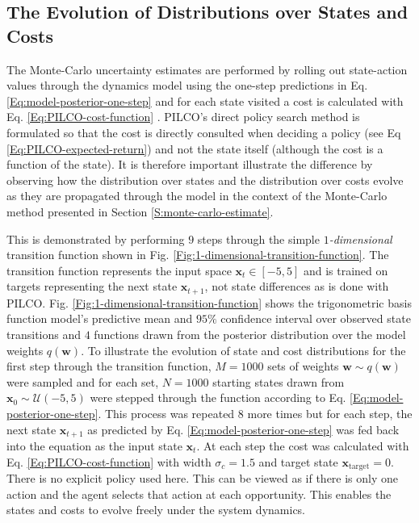 \subsection{The Evolution of Distributions over States and Costs}
The Monte-Carlo uncertainty estimates are performed by rolling out state-action values through the dynamics model using the one-step predictions in Eq. \ref{Eq:model-posterior-one-step} and for each state visited a cost is calculated with Eq. \ref{Eq:PILCO-cost-function} . PILCO's direct policy search method is formulated so that the cost is directly consulted when deciding a policy (see Eq \ref{Eq:PILCO-expected-return}) and not the state itself (although the cost is a function of the state). It is therefore important illustrate the difference by observing how the distribution over states and the distribution over costs evolve as they are propagated through the model in the context of the Monte-Carlo method presented in Section \ref{S:monte-carlo-estimate}.

This is demonstrated by performing $9$ steps through the simple $1$\textit{-dimensional} transition function shown in Fig. \ref{Fig:1-dimensional-transition-function}. The transition function represents the input space $\mathbf{x}_{t}\in [-5, 5]$ and is trained on targets representing the next state $\mathbf{x}_{t+1}$, not state differences as is done with PILCO. Fig. \ref{Fig:1-dimensional-transition-function} shows the trigonometric basis function model's predictive mean and $95\%$ confidence interval over observed state transitions and $4$ functions drawn from the posterior distribution over the model weights $q(\mathbf{w})$. To illustrate the evolution of state and cost distributions for the first step through the transition function, $M=1000$ sets of weights $\mathbf{w} \sim q(\mathbf{w})$ were sampled and for each set, $N=1000$ starting states drawn from $\mathbf{x}_{0} \sim \mathcal{U}(-5,5)$ were stepped through the function according to Eq. \ref{Eq:model-posterior-one-step}. This process was repeated $8$ more times but for each step, the next state $\mathbf{x}_{t+1}$ as predicted by Eq. \ref{Eq:model-posterior-one-step} was fed back into the equation as the input state $\mathbf{x}_{t}$. At each step the cost was calculated with Eq. \ref{Eq:PILCO-cost-function} with width $\sigma_{c}=1.5$ and target state $\mathbf{x}_{\text{target}}=0$. There is no explicit policy used here. This can be viewed as if there is only one action and the agent selects that action at each opportunity. This enables the states and costs to evolve freely under the system dynamics.

